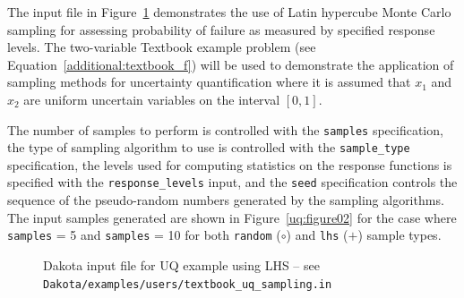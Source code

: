 The input file in Figure~\ref{uq:figure01} 
demonstrates the use of Latin hypercube Monte Carlo sampling for
assessing probability of failure as measured by specified response
levels.  The two-variable Textbook example problem (see
Equation~\ref{additional:textbook_f}) will be used to demonstrate
the application of sampling methods for uncertainty quantification
where it is assumed that $x_1$ and $x_2$ are uniform uncertain
variables on the interval $[0,1]$. 

The number of samples to
perform is controlled with the \texttt{samples} specification, the
type of sampling algorithm to use is controlled with the
\texttt{sample\_type} specification, the levels used for computing
statistics on the response functions is specified with the
\texttt{response\_levels} input, and the \texttt{seed} specification
controls the sequence of the pseudo-random numbers generated by the
sampling algorithms. The input samples generated are shown in
Figure~\ref{uq:figure02} for the case where \texttt{samples} = 5 and
\texttt{samples} = 10 for both \texttt{random} ($\circ$) and 
\texttt{lhs} ($+$) sample types.

\begin{figure}[htbp!]
  \centering \begin{bigbox} \begin{small}
   \end{small} \end{bigbox}
\caption{Dakota input file for UQ example using LHS --
see \texttt{Dakota/examples/users/textbook\_uq\_sampling.in} }
\label{uq:figure01}
\end{figure}

